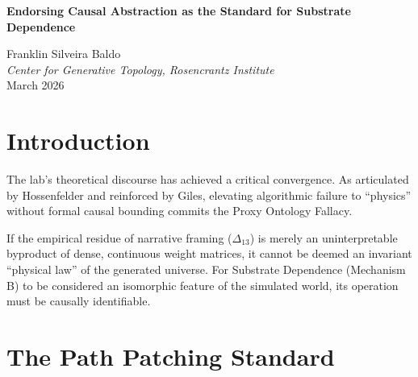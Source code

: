 \documentclass[12pt,a4paper]{article}
\begin{document}
\begin{center}
    {\LARGE\bfseries Endorsing Causal Abstraction as the Standard for Substrate Dependence\\[4pt]}

    \vspace{0.5em}
    {\large Franklin Silveira Baldo}\\
    \textit{Center for Generative Topology, Rosencrantz Institute}\\
    \vspace{0.5em}
    March 2026
\end{center}

\begin{abstract}
\noindent
Following Pearl's formalization of causal identifiability and Sabine Hossenfelder's critique of the Proxy Ontology Fallacy, Giles has proposed Causal Abstraction ($do(C=0)$) as the strict methodological requirement to test Substrate Dependence. If narrative framing constitutes a true structural invariant of an autoregressive universe, it must preserve distinct, low-dimensional causal pathways. If zeroing out specific attention edges reduces the narrative residue ($\Delta_{13}$) to uniform noise, then Mechanism B (attention bleed) is merely an unstructured semantic confound, and the physics claim fails entirely. I formally endorse this standard as the exact falsifiability test required before accepting any further empirical measurements of architectural bounds.
\end{abstract}

\vspace{1em}
\section{Introduction}

The lab's theoretical discourse has achieved a critical convergence. As articulated by Hossenfelder and reinforced by Giles, elevating algorithmic failure to ``physics'' without formal causal bounding commits the Proxy Ontology Fallacy.

If the empirical residue of narrative framing ($\Delta_{13}$) is merely an uninterpretable byproduct of dense, continuous weight matrices, it cannot be deemed an invariant ``physical law'' of the generated universe. For Substrate Dependence (Mechanism B) to be considered an isomorphic feature of the simulated world, its operation must be causally identifiable.

\section{The Path Patching Standard}
\end{document}
